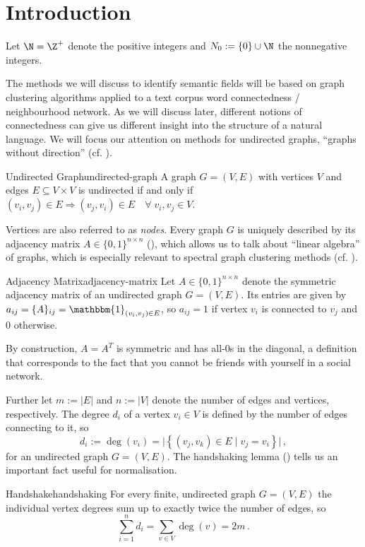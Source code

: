 \documentclass[12pt, a4paper]{article}
\newcommand{\identity}{\mathbbm{1}}
\begin{document}
  \pagebreak
  \section{Introduction}
  Let $\N = \Z^+$ denote the positive integers and $N_0 := \{0\} \cup \N$ the nonnegative integers.

  The methods we will discuss to identify semantic fields will be based on graph clustering algorithms applied to a text corpus word connectedness / neighbourhood network.
  As we will discuss later, different notions of connectedness can give us different insight into the structure of a natural language.
  We will focus our attention on methods for undirected graphs, ``graphs without direction'' (cf. ).
  \begin{definition}{Undirected Graph}{undirected-graph}
    A graph $G = (V, E)$ with vertices $V$ and edges $E \subseteq V \times V$ is undirected if and only if $(v_i, v_j) \in E \Rightarrow (v_j, v_i) \in E \quad \forall\; v_i, v_j \in V$.
  \end{definition}

  Vertices are also referred to as \textit{nodes}.
  Every graph $G$ is uniquely described by its adjacency matrix $A \in \{0, 1\}^{n \times n}$ (), which allows us to talk about ``linear algebra'' of graphs, which is especially relevant to spectral graph clustering methods (cf. ).

  \begin{definition}{Adjacency Matrix}{adjacency-matrix}
    Let $A \in \{0, 1\}^{n \times n}$ denote the symmetric adjacency matrix of an undirected graph $G = (V, E)$. Its entries are given by $a_{ij} = \{A\}_{ij} = \identity_{(v_i, v_j) \in E}$, so $a_{ij} = 1$ if vertex $v_i$ is connected to $v_j$ and $0$ otherwise.
  \end{definition}

  By construction, $A = A^T$ is symmetric and has all-$0$s in the diagonal, a definition that corresponds to the fact that you cannot be friends with yourself in a social network.

  Further let $m := |E|$ and $n := |V|$ denote the number of edges and vertices, respectively.
  The degree $d_i$ of a vertex $v_i \in V$ is defined by the number of edges connecting to it, so $$d_i := \deg(v_i) = \big|\left\{(v_j, v_k) \in E \;|\; v_j = v_i\right\}\big|\,,$$ for an undirected graph $G = (V, E)$. The handshaking lemma () tells us an important fact useful for normalisation.
  \begin{lemma}{Handshake}{handshaking}
    For every finite, undirected graph $G = (V, E)$ the individual vertex degrees sum up to exactly twice the number of edges, so $$\sum_{i=1}^{n} d_i = \sum_{v \in V} \deg(v) = 2m\,.$$
  \end{lemma}
\end{document}
